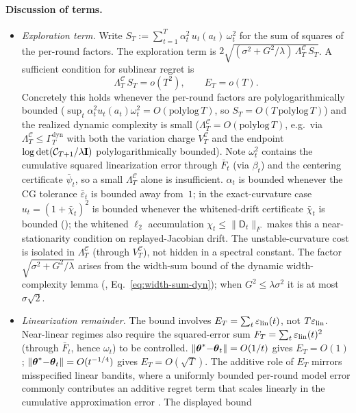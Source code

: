 \documentclass[twoside]{article}
\newcommand{\Calg}{\mathcal{C}}                 %
\newcommand{\Lamalg}{\Lambda^{\Calg}}           %
\newcommand{\Valg}{V^{\Calg}}                   %
\newcommand{\Gamdyn}{\Gamma^{\mathrm{dyn}}}     %
\newcommand{\Dmat}{\mathsf{D}}                  %
\begin{document}
\paragraph{Discussion of terms.}
\begin{itemize}[nosep,leftmargin=1.5em]
\item \emph{Exploration term.}
Write $S_T:=\sum_{t=1}^T\alpha_t^2\,u_t(a_t)\,\omega_t^2$ for the sum of
squares of the per-round factors.  The exploration term is
$2\sqrt{(\sigma^2+G^2/\lambda)\,\Lamalg_T\,S_T}$.  A sufficient condition
for sublinear regret is
\[
  \Lamalg_T\,S_T = o(T^2),
  \qquad
  E_T=o(T).
\]
Concretely this holds whenever the per-round factors are polylogarithmically
bounded ($\sup_t\alpha_t^2 u_t(a_t)\omega_t^2 = O(\mathrm{polylog}\,T)$, so
$S_T=O(T\,\mathrm{polylog}\,T)$) and the realized dynamic complexity is
small ($\Lamalg_T=O(\mathrm{polylog}\,T)$, e.g.\ via $\Lamalg_T\le\Gamdyn_T$
with both the variation charge $\Valg_T$ and the endpoint
$\log\det(\Calg_{T+1}/\lambda\bI)$ polylogarithmically bounded).
Note $\omega_t^2$ contains the cumulative squared linearization error
through $\bar F_t$ (via $\beta_t$) and the centering certificate
$\bar\psi_t$, so a small $\Lamalg_T$ alone is insufficient.
$\alpha_t$ is bounded whenever the CG tolerance $\bar\varepsilon_t$ is
bounded away from~$1$; in the exact-curvature case $u_t=(1+\bar\chi_t)^2$
is bounded whenever the whitened-drift certificate $\bar\chi_t$ is bounded
(); the whitened $\ell_2$ accumulation
$\chi_t\le\|\Dmat_t\|_F$ makes this a near-stationarity condition on
replayed-Jacobian drift.  The unstable-curvature cost is isolated in
$\Lamalg_T$ (through $\Valg_T$), not hidden in a spectral constant.
The factor $\sqrt{\sigma^2+G^2/\lambda}$ arises from the width-sum bound of the
dynamic width-complexity lemma (,
Eq.~\eqref{eq:width-sum-dyn}); when $G^2\le\lambda\sigma^2$ it is at most
$\sigma\sqrt2$.
\item \emph{Linearization remainder.}
The bound involves $E_T=\sum_t\varepsilon_{\mathrm{lin}}(t)$, not $T\varepsilon_{\mathrm{lin}}$.
Near-linear regimes also require the squared-error sum
$F_T=\sum_t\varepsilon_{\mathrm{lin}}(t)^2$ (through $\bar F_t$, hence $\omega_t$) to be
controlled.  $\|\boldsymbol{\theta}^*{-}\boldsymbol{\theta}_t\|=O(1/t)$ gives $E_T=O(1)$;
$\|\boldsymbol{\theta}^*{-}\boldsymbol{\theta}_t\|=O(t^{-1/4})$ gives $E_T=O(\sqrt{T})$.
The additive role of $E_T$ mirrors misspecified linear bandits, where a
uniformly bounded per-round model error commonly contributes an additive regret
term that scales linearly in the cumulative approximation error
\citep{ghosh2017misspecified,lattimore2020learning}.  The displayed bound

\end{itemize}
\end{document}
